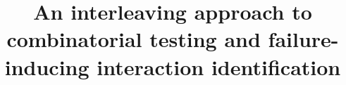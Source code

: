 \documentclass[10pt,journal,compsoc]{IEEEtran}
\begin{document}
%
\title{An interleaving approach to combinatorial testing and failure-inducing interaction identification}
%
%
%
%
\end{document}
